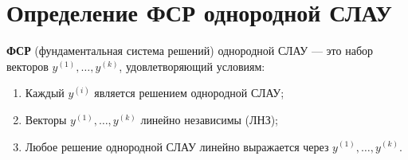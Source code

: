 \section{Определение ФСР однородной СЛАУ}

\begin{definition}
\textbf{ФСР} (фундаментальная система решений) однородной СЛАУ --- это набор векторов $y^{(1)}, \ldots, y^{(k)}$, удовлетворяющий условиям:
\begin{enumerate}
    \item Каждый $y^{(i)}$ является решением однородной СЛАУ;
    \item Векторы $y^{(1)}, \ldots, y^{(k)}$ линейно независимы (ЛНЗ);
    \item Любое решение однородной СЛАУ линейно выражается через $y^{(1)}, \ldots, y^{(k)}$.
\end{enumerate}
\end{definition}
